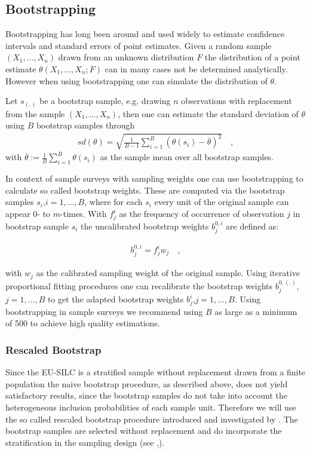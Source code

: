 \documentclass{scrartcl}
\begin{document}
\subsection{Bootstrapping}
Bootstrapping has long been around and used widely to estimate confidence intervals and standard errors of point estimates.\citep{efron1979}
Given a random sample $(X_1,\ldots,X_n)$ drawn from an unknown distribution $F$ the distribution of a point estimate $\theta(X_1,\ldots,X_n;F)$ can in many cases not be determined analytically. However when using bootstrapping one can simulate the distribution of $\theta$.

Let $s_{(.)}$ be a bootstrap sample, e.g. drawing $n$ observations with replacement from the sample $(X_1,\ldots,X_n)$, then one can estimate the standard deviation of $\theta$  using $B$ bootstrap samples through
\begin{align*}
  sd(\theta) = \sqrt{\frac{1}{B-1}\sum\limits_{i=1}^B (\theta(s_i)-\overline{\theta})^2} \quad,
\end{align*}
with $\overline{\theta}:=\frac{1}{B}\sum\limits_{i=1}^B\theta(s_i)$ as the sample mean over all bootstrap samples.

In context of sample surveys with sampling weights one can use bootstrapping to calculate so called bootstrap weights. These are computed via the bootstrap samples $s_{i}$,$i=1,\ldots,B$, where for each $s_{i}$ every unit of the original sample can appear $0$- to $m$-times. With $f_j^{i}$ as the frequency of occurrence of observation $j$ in bootstrap sample $s_i$ the uncalibrated bootstrap weights $b_{j}^{0,i}$ are defined as:

\begin{align*}
  b_{j}^{0,i} = f_j^{i} w_j \quad,
\end{align*}

with $w_j$ as the calibrated sampling weight of the original sample.
Using iterative proportional fitting procedures one can recalibrate the bootstrap weights $b_{j}^{0,(.)}$,$j=1,\ldots,B$ to get the adapted bootstrap weights $b_j^i$,$j=1,\ldots,B$. Using bootstrapping in sample surveys we recommend using $B$ as large as a minimum of 500 to achieve high quality estimations.

\subsubsection{Rescaled Bootstrap}
Since the EU-SILC is a stratified sample without replacement drawn from a finite population the naive bootstrap procedure, as described above, does not yield satisfactory results, since the bootstrap samples do not take into account the heterogeneous inclusion probabilities of each sample unit. Therefore we will use the so called rescaled bootstrap procedure introduced and investigated by \citep{raowu1988}. The bootstrap samples are selected without replacement and do incorporate the stratification in the sampling design (see \citep{chipprest2007},\citep{prest2009}).
\end{document}
